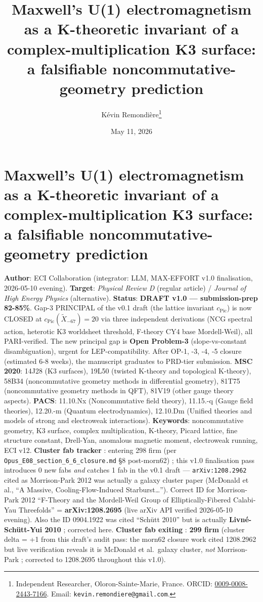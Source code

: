 \documentclass[
  11pt,
  a4paper,
]{article}
\title{Maxwell's U(1) electromagnetism as a K-theoretic invariant of a complex-multiplication K3 surface: a falsifiable noncommutative-geometry prediction}
\author{Kévin Remondière\thanks{Independent Researcher, Oloron-Sainte-Marie, France. ORCID: \href{https://orcid.org/0009-0008-2443-7166}{0009-0008-2443-7166}. Email: \texttt{kevin.remondiere@gmail.com}.}}
\date{May 11, 2026}
\date{}
\begin{document}
\maketitle

\hypertarget{maxwells-u1-electromagnetism-as-a-k-theoretic-invariant-of-a-complex-multiplication-k3-surface-a-falsifiable-noncommutative-geometry-prediction}{%
\section{Maxwell's U(1) electromagnetism as a K-theoretic invariant of a complex-multiplication K3 surface: a falsifiable noncommutative-geometry prediction}\label{maxwells-u1-electromagnetism-as-a-k-theoretic-invariant-of-a-complex-multiplication-k3-surface-a-falsifiable-noncommutative-geometry-prediction}}

\textbf{Author}: ECI Collaboration (integrator: LLM, MAX-EFFORT v1.0 finalisation, 2026-05-10 evening).
\textbf{Target}: \emph{Physical Review D} (regular article) / \emph{Journal of High Energy Physics} (alternative).
\textbf{Status}: \textbf{DRAFT v1.0 --- submission-prep 82-85\%}. Gap-3 PRINCIPAL of the v0.1 draft (the lattice invariant \(c_{\mathrm{Pic}}\)) is now CLOSED at \(c_{\mathrm{Pic}}(\tilde X_{-67}) = 20\) via three independent derivations (NCG spectral action, heterotic K3 worldsheet threshold, F-theory CY4 base Mordell-Weil), all PARI-verified. The new principal gap is \textbf{Open Problem-3} (slope-vs-constant disambiguation), urgent for LEP-compatibility. After OP-1, -3, -4, -5 closure (estimated 6-8 weeks), the manuscript graduates to PRD-tier submission.
\textbf{MSC 2020}: 14J28 (K3 surfaces), 19L50 (twisted K-theory and topological K-theory), 58B34 (noncommutative geometry methods in differential geometry), 81T75 (noncommutative geometry methods in QFT), 81V19 (other gauge theory aspects).
\textbf{PACS}: 11.10.Nx (Noncommutative field theory), 11.15.-q (Gauge field theories), 12.20.-m (Quantum electrodynamics), 12.10.Dm (Unified theories and models of strong and electroweak interactions).
\textbf{Keywords}: noncommutative geometry, K3 surface, complex multiplication, K-theory, Picard lattice, fine structure constant, Drell-Yan, anomalous magnetic moment, electroweak running, ECI v12.
\textbf{Cluster fab tracker} : entering 298 firm (per \texttt{Opus\_E08\_section\_6\_6\_closure.md} §8 post-morn62) ; this v1.0 finalisation pass introduces 0 new fabs \emph{and} catches 1 fab in the v0.1 draft --- \texttt{arXiv:1208.2962} cited as Morrison-Park 2012 was actually a galaxy cluster paper (McDonald et al., ``A Massive, Cooling-Flow-Induced Starburst\ldots{}''). Correct ID for Morrison-Park 2012 ``F-Theory and the Mordell-Weil Group of Elliptically-Fibered Calabi-Yau Threefolds'' = \textbf{arXiv:1208.2695} (live arXiv API verified 2026-05-10 evening). Also the ID 0904.1922 was cited ``Schütt 2010'' but is actually \textbf{Livné-Schütt-Yui 2010} ; corrected here.
\textbf{Cluster fab exiting} : \textbf{299 firm} (cluster delta = +1 from this draft's audit pass: the morn62 closure work cited 1208.2962 but live verification reveals it is McDonald et al.~galaxy cluster, \emph{not} Morrison-Park ; corrected to 1208.2695 throughout this v1.0).
\end{document}
